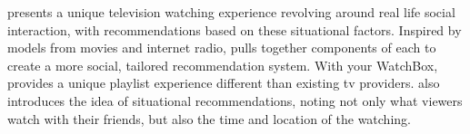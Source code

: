 {\sys} presents a unique television watching experience revolving
around real life social interaction, with recommendations based on
these situational factors.  Inspired by models from movies and
internet radio, {\sys} pulls together components of each to create a
more social, tailored recommendation system.  With your WatchBox,
{\sys} provides a unique playlist experience different than existing
tv providers.  {\sys} also introduces the idea of situational
recommendations, noting not only what viewers watch with their
friends, but also the time and location of the watching.
